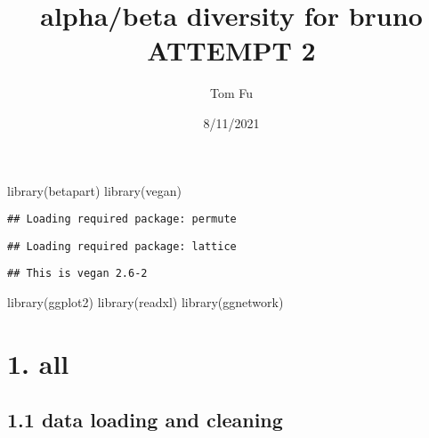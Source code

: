 \documentclass[
]{article}
\title{alpha/beta diversity for bruno ATTEMPT 2}
\author{Tom Fu}
\date{8/11/2021}
\newenvironment{Shaded}{\begin{snugshade}}{\end{snugshade}}
\newcommand{\CommentTok}[1]{\textcolor[rgb]{0.56,0.35,0.01}{\textit{#1}}}
\newcommand{\DecValTok}[1]{\textcolor[rgb]{0.00,0.00,0.81}{#1}}
\newcommand{\FunctionTok}[1]{\textcolor[rgb]{0.00,0.00,0.00}{#1}}
\newcommand{\NormalTok}[1]{#1}
\newcommand{\OtherTok}[1]{\textcolor[rgb]{0.56,0.35,0.01}{#1}}
\newcommand{\SpecialCharTok}[1]{\textcolor[rgb]{0.00,0.00,0.00}{#1}}
\newcommand{\StringTok}[1]{\textcolor[rgb]{0.31,0.60,0.02}{#1}}
\begin{document}
\maketitle

\begin{Shaded}
\begin{Highlighting}[]
\FunctionTok{library}\NormalTok{(betapart)}
\FunctionTok{library}\NormalTok{(vegan)}
\end{Highlighting}
\end{Shaded}

\begin{verbatim}
## Loading required package: permute
\end{verbatim}

\begin{verbatim}
## Loading required package: lattice
\end{verbatim}

\begin{verbatim}
## This is vegan 2.6-2
\end{verbatim}

\begin{Shaded}
\begin{Highlighting}[]
\FunctionTok{library}\NormalTok{(ggplot2)}
\FunctionTok{library}\NormalTok{(readxl)}
\FunctionTok{library}\NormalTok{(ggnetwork)}
\end{Highlighting}
\end{Shaded}

\hypertarget{all}{%
\section{1. all}\label{all}}

\hypertarget{data-loading-and-cleaning}{%
\subsection{1.1 data loading and
cleaning}\label{data-loading-and-cleaning}}

\begin{Shaded}
\end{Shaded}
\end{document}
